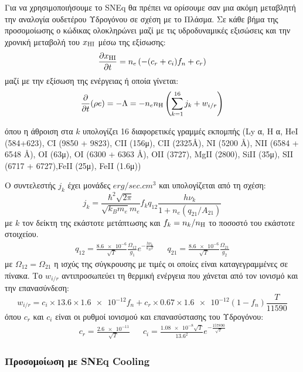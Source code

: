 	Για να χρησιμοποιήσουμε το SNEq θα πρέπει να ορίσουμε σαν μια ακόμη μεταβλητή την
	αναλογία ουδετέρου Υδρογόνου σε σχέση με το Πλάσμα.
	Σε κάθε βήμα της προσομοίωσης ο κώδικας ολοκληρώνει μαζί με τις υδροδυναμικές εξισώσεις και την χρονική μεταβολή του $x_{\ce{HI}}$ μέσω της εξίσωσης:
	\begin{equation}
	\pdv{x_{\ce{HI}}}{t}=n_e \left( -(c_r+c_i)f_n+c_r\right) 
	\end{equation}
	μαζί με την εξίσωση της ενέργειας ή οποία γίνεται:
	\begin{equation}
	\pdv{t}(\rho e)=-\Lambda=-n_e n_{\ce{H}} \left( \sum\limits_{k=1}^{16}j_k +w_{i/r} \right) 
	\end{equation}
	
	όπου η άθροιση στα $k$ υπολογίζει 16 διαφορετικές γραμμές εκπομπής 
	(Ly α, H α, HeI (584+623), CI (9850 + 9823), CII (156μ), CII (2325Å), NI (5200 Å),
	NII (6584 + 6548 Å), OI (63μ), OI (6300 + 6363 Å), OII (3727), MgII (2800), SiII (35μ), SII (6717 + 6727),FeII (25μ), FeII (1.6μ))
	
	Ο συντελεστής $j_k$ έχει μονάδες $\si{erg/sec . cm^3}$ και υπολογίζεται από τη σχέση:
	\begin{equation}
	j_k=\frac{\hbar^2 \sqrt{2\pi}}{\sqrt{k_B m_e}m_e}f_k q_{12}\frac{h \nu _k}{1+n_e (q_{21}/A_{21})}
	\end{equation}
	με $k$ τον δείκτη της εκάστοτε μετάπτωσης και $f_k=n_k/n_{\ce{H}}$ το ποσοστό του εκάστοτε στοιχείου.
	\begin{align}
	q_{12}=\frac{\num{8.6e-6}}{\sqrt{T}}\frac{\Omega _{12}}{g_1}e^{-\frac{h\nu _k}{k_B T}} 
	&&
	q_{21}=\frac{\num{8.6e-6}}{\sqrt{T}}\frac{\Omega _{21}}{g_2}
	\end{align} 
	με $\Omega _{12} = \Omega _{21}$ η ισχύς της σύγκρουσης με τιμές οι οποίες είναι καταγεγραμμένες σε πίνακα.
	Το $w_{i/r}$ αντιπροσωπεύει τη θερμική ενέργεια που χάνεται από τον ιονισμό και την επανασύνδεση:
	\begin{equation}
	w_{i/r} = c_i\times \num{13.6}\times \num{1.6e-12} f_n +c_r \times \num{0.67}\times \num{1.6e-12} (1-f_n) \frac{T}{11590}
	\end{equation}
	όπου $c_r$ και $c_i$ είναι οι ρυθμοί ιονισμού και επανασύστασης του Υδρογόνου:
	\begin{align}
	c_r=\frac{\num{2.6e-11}}{\sqrt{T}} 
	&& 
	c_i=\frac{\num{1.08e-8}\sqrt{T}}{\num{13.6}^2} e^{-\frac{\num{157890}}{\sqrt{T}}}
	\end{align}
	
	
	\subsubsection{Προσομοίωση με SNEq Cooling}
	
